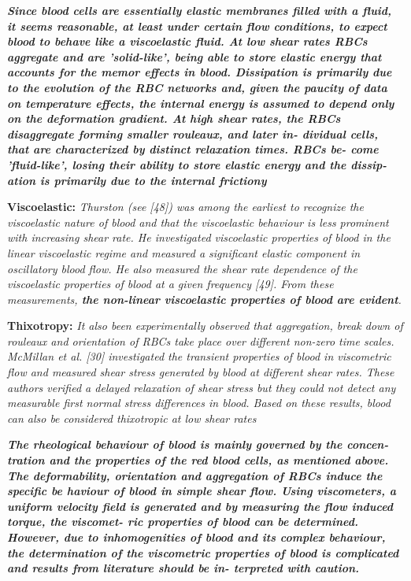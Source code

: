 \documentclass[11pt,letterpaper]{article}
\begin{document}
{\color{blue}\textit{\textbf{Since blood cells are essentially elastic membranes filled with a fluid, it
seems reasonable, at least under certain flow conditions, to expect blood to behave like a viscoelastic fluid. At low shear rates RBCs aggregate and are 'solid-like', being able to store elastic energy that accounts for the memor effects in blood. Dissipation is primarily due to the evolution of the RBC networks and, given the paucity of data on temperature effects, the internal energy is assumed to depend only on the deformation gradient. At high shear rates, the RBCs disaggregate forming smaller rouleaux, and later in- dividual cells, that are characterized by distinct relaxation times. RBCs be- come 'fluid-like', losing their ability to store elastic energy and the dissip- ation is primarily due to the internal frictiony}}}


\textbf{Viscoelastic:} \textit{Thurston (see [48]) was among the earliest to recognize the viscoelastic nature of blood and that the viscoelastic behaviour is less prominent with increasing shear rate. He investigated viscoelastic properties of blood in the linear viscoelastic regime and measured a significant elastic component in oscillatory blood flow. He also measured the shear rate dependence of the viscoelastic properties of blood at a given frequency [49]. From these measurements, \textbf{the non-linear viscoelastic properties of blood are evident}.}


\textbf{Thixotropy:} \textit{It also been experimentally observed that aggregation, break down of
rouleaux and orientation of RBCs take place over different non-zero time scales. McMillan et al. [30] investigated the transient properties of blood in viscometric flow and measured shear stress generated by blood at different shear rates. These authors verified a delayed relaxation of shear stress but they could not detect any measurable first normal stress differences in blood. Based on these results, blood can also be considered thixotropic at low shear rates}



\textit{\textbf{The rheological behaviour of blood is mainly governed by the concen-
tration and the properties of the red blood cells, as mentioned above. The deformability, orientation and aggregation of RBCs induce the specific be haviour of blood in simple shear flow. Using viscometers, a uniform velocity field is generated and by measuring the flow induced torque, the viscomet- ric properties of blood can be determined. However, due to inhomogenities of blood and its complex behaviour, the determination of the viscometric properties of blood is complicated and results from literature should be in- terpreted with caution.}}
\end{document}
